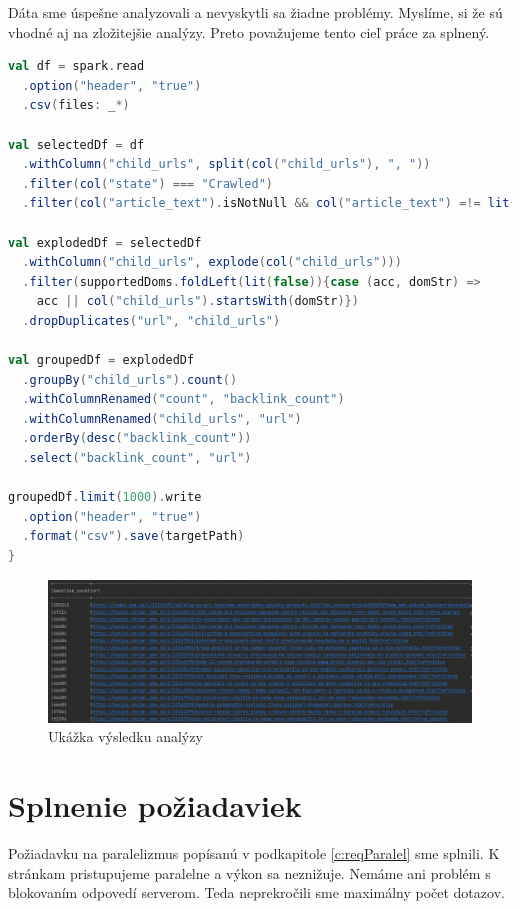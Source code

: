 Dáta sme úspešne analyzovali a nevyskytli sa žiadne problémy. Myslíme, si že sú vhodné aj na zložitejšie analýzy. Preto považujeme tento cieľ práce za splnený.

\begin{lstlisting}[language=Scala,caption={Primitívna analýza spätných odkazov v Apache Spark}]
val df = spark.read
  .option("header", "true")
  .csv(files: _*)

val selectedDf = df
  .withColumn("child_urls", split(col("child_urls"), ", "))
  .filter(col("state") === "Crawled")
  .filter(col("article_text").isNotNull && col("article_text") =!= lit(""))

val explodedDf = selectedDf
  .withColumn("child_urls", explode(col("child_urls")))
  .filter(supportedDoms.foldLeft(lit(false)){case (acc, domStr) =>
    acc || col("child_urls").startsWith(domStr)})
  .dropDuplicates("url", "child_urls")

val groupedDf = explodedDf
  .groupBy("child_urls").count()
  .withColumnRenamed("count", "backlink_count")
  .withColumnRenamed("child_urls", "url")
  .orderBy(desc("backlink_count"))
  .select("backlink_count", "url")

groupedDf.limit(1000).write
  .option("header", "true")
  .format("csv").save(targetPath)
}
\end{lstlisting}\label{code:backlink}

\begin{figure}[!ht]
    \centering
    \includegraphics[width=1\textwidth]{figures/analExample.png}
    \caption{Ukážka výsledku analýzy\label{o:analRes}}
\end{figure}



\section{Splnenie požiadaviek}
Požiadavku na paralelizmus popísanú v podkapitole \ref{c:reqParalel} sme splnili. K stránkam pristupujeme paralelne a výkon sa neznižuje. Nemáme ani problém s blokovaním odpovedí serverom. Teda neprekročili sme maximálny počet dotazov. 

